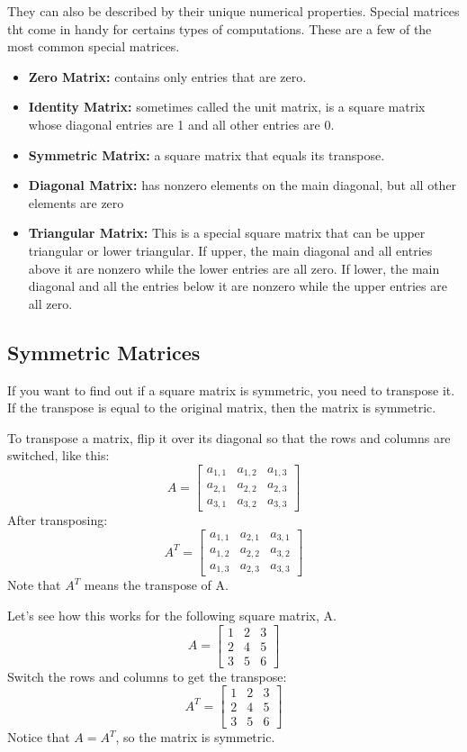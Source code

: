 They can also be described by their unique numerical properties. Special matrices tht come in handy for certains types of computations. These are a few of the most common special matrices.
\begin{itemize}
	\item \textbf{Zero Matrix:} contains only entries that are zero.
	\item \textbf{Identity Matrix:} sometimes called the unit matrix, is a square matrix whose diagonal entries are 1 and all other entries are 0.
	\item \textbf{Symmetric Matrix:} a square matrix that equals its transpose.
	\item \textbf{Diagonal Matrix:} has nonzero elements on the main diagonal, but all other elements are zero
	\item \textbf{Triangular Matrix:} This is a special square matrix that can be upper triangular or lower triangular. If upper, the main diagonal and all entries above it are nonzero while the lower entries are all zero. If lower, the main diagonal and all the entries below it are nonzero while the upper entries are all zero. 
\end{itemize}

\subsection{Symmetric Matrices}
If you want to find out if a square matrix is symmetric, you need to transpose it. If the transpose is equal to the original matrix, then the matrix is symmetric.

To transpose a matrix, flip it over its diagonal so that the rows and columns are switched, like this:
$$
A = \begin{bmatrix}
a_{1,1} & a_{1,2} & a_{1,3} \\
a_{2,1} & a_{2,2} & a_{2,3} \\
a_{3,1} & a_{3,2} & a_{3,3}
\end{bmatrix}
$$
After transposing:
$$
A^T = \begin{bmatrix}
a_{1,1} & a_{2,1} & a_{3,1} \\
a_{1,2} & a_{2,2} & a_{3,2} \\
a_{1,3} & a_{2,3} & a_{3,3}
\end{bmatrix}
$$
Note that $A^T$ means the transpose of A. 

Let's see how this works for the following square matrix, A.
$$
A = \begin{bmatrix}
1 & 2 & 3 \\
2 & 4 & 5 \\
3 & 5 & 6
\end{bmatrix}
$$
Switch the rows and columns to get the transpose:
$$
A^T = \begin{bmatrix}
1 & 2 & 3 \\
2 & 4 & 5 \\
3 & 5 & 6
\end{bmatrix}
$$
Notice that $A = A^T$, so the matrix is symmetric.

